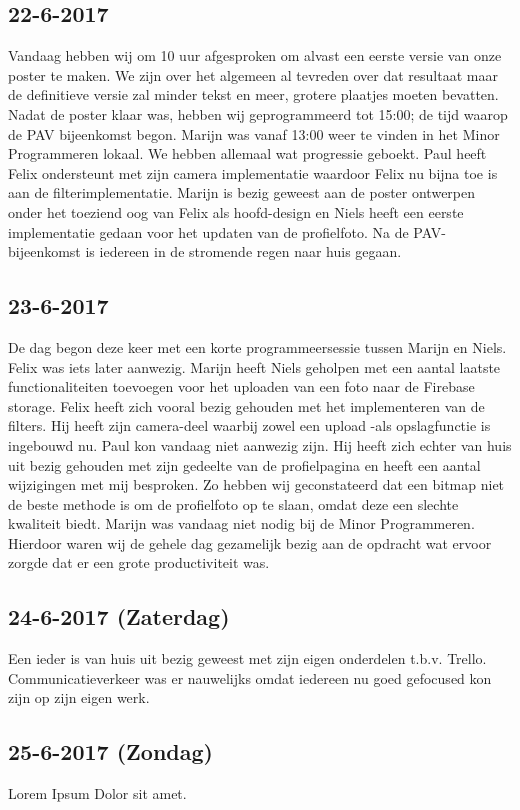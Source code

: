 \documentclass{uva-inf-article}
\begin{document}
\subsection{22-6-2017}
Vandaag hebben wij om 10 uur afgesproken om alvast een eerste versie van onze poster te maken. We zijn over het algemeen al tevreden over dat resultaat maar de definitieve versie zal minder tekst en meer, grotere plaatjes moeten bevatten.
Nadat de poster klaar was, hebben wij geprogrammeerd tot 15:00; de tijd waarop de PAV bijeenkomst begon.
Marijn was vanaf 13:00 weer te vinden in het Minor Programmeren lokaal. We hebben allemaal wat progressie geboekt. Paul heeft Felix ondersteunt met zijn camera implementatie waardoor Felix nu bijna toe is aan de filterimplementatie.
Marijn is bezig geweest aan de poster ontwerpen onder het toeziend oog van Felix als hoofd-design en Niels heeft een eerste implementatie gedaan voor het updaten van de profielfoto. Na de PAV-bijeenkomst is iedereen in de stromende regen naar huis gegaan.
\subsection{23-6-2017}
De dag begon deze keer met een korte programmeersessie tussen Marijn en Niels. Felix was iets later aanwezig. Marijn heeft Niels geholpen met een aantal laatste functionaliteiten toevoegen voor het uploaden van een foto naar de Firebase storage. Felix heeft zich vooral bezig gehouden met het implementeren van de filters. Hij heeft zijn camera-deel waarbij zowel een upload -als opslagfunctie is ingebouwd nu.
Paul kon vandaag niet aanwezig zijn. Hij heeft zich echter van huis uit bezig gehouden met zijn gedeelte van de profielpagina en heeft een aantal wijzigingen met mij besproken. Zo hebben wij geconstateerd dat een bitmap niet de beste methode is om de profielfoto op te slaan, omdat deze een slechte kwaliteit biedt.
Marijn was vandaag niet nodig bij de Minor Programmeren. Hierdoor waren wij de gehele dag gezamelijk bezig aan de opdracht wat ervoor zorgde dat er een grote productiviteit was.
\subsection{24-6-2017 (Zaterdag) }
Een ieder is van huis uit bezig geweest met zijn eigen onderdelen t.b.v. Trello. Communicatieverkeer was er nauwelijks omdat iedereen nu goed gefocused kon zijn op zijn eigen werk.
\subsection{25-6-2017 (Zondag) }
Lorem Ipsum Dolor sit amet.
\end{document}
